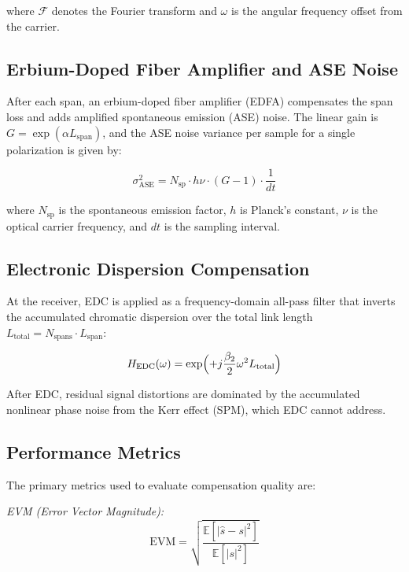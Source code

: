 \documentclass[conference]{IEEEtran}
\begin{document}
where $\mathcal{F}$ denotes the Fourier transform and $\omega$ is the angular frequency offset from the carrier.

\subsection{Erbium-Doped Fiber Amplifier and ASE Noise}

After each span, an erbium-doped fiber amplifier (EDFA) compensates the span loss and adds amplified spontaneous emission (ASE) noise. The linear gain is $G = \exp(\alpha L_{\text{span}})$, and the ASE noise variance per sample for a single polarization is given by:

\begin{equation}
\sigma_{\text{ASE}}^2 = N_{\text{sp}} \cdot h \nu \cdot (G - 1) \cdot \frac{1}{dt}
\label{eq:ase}
\end{equation}

where $N_{\text{sp}}$ is the spontaneous emission factor, $h$ is Planck's constant, $\nu$ is the optical carrier frequency, and $dt$ is the sampling interval.

\subsection{Electronic Dispersion Compensation}

At the receiver, EDC is applied as a frequency-domain all-pass filter that inverts the accumulated chromatic dispersion over the total link length $L_{\text{total}} = N_{\text{spans}} \cdot L_{\text{span}}$:

\begin{equation}
H_{\text{EDC}}(\omega) = \exp\Bigl(+j\frac{\beta_2}{2}\omega^2 L_{\text{total}}\Bigr)
\label{eq:edc}
\end{equation}

After EDC, residual signal distortions are dominated by the accumulated nonlinear phase noise from the Kerr effect (SPM), which EDC cannot address.

\subsection{Performance Metrics}

The primary metrics used to evaluate compensation quality are:

\textit{EVM (Error Vector Magnitude):}
\begin{equation}
\text{EVM} = \sqrt{\frac{\mathbb{E}[|\hat{s} - s|^2]}{\mathbb{E}[|s|^2]}}
\label{eq:evm}
\end{equation}
\end{document}
